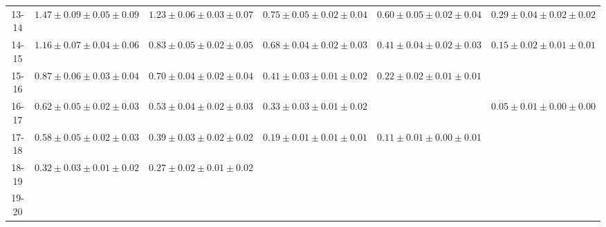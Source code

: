 \begin{sidewaystable}[!htbp]
{\begin{tabular}{c|ccccc}
13-14 & $1.47\pm0.09\pm0.05\pm0.09$ & $1.23\pm0.06\pm0.03\pm0.07$ & $0.75\pm0.05\pm0.02\pm0.04$ & $0.60\pm0.05\pm0.02\pm0.04$ & $0.29\pm0.04\pm0.02\pm0.02$\\  \cline{6-6}
14-15 &   $1.16\pm0.07\pm0.04\pm0.06$ &   $0.83\pm0.05\pm0.02\pm0.05$ &   $0.68\pm0.04\pm0.02\pm0.03$ &   $0.41\pm0.04\pm0.02\pm0.03$ &  \multirow{2}{*}{ $0.15\pm0.02\pm0.01\pm0.01$}   \\  \cline{5-5}
15-16 &   $0.87\pm0.06\pm0.03\pm0.04$ &   $0.70\pm0.04\pm0.02\pm0.04$ &   $0.41\pm0.03\pm0.01\pm0.02$ & \multirow{2}{*}{ $0.22\pm0.02\pm0.01\pm0.01$} &   \\  \cline{6-6}
16-17 &    $0.62\pm0.05\pm0.02\pm0.03$ &    $0.53\pm0.04\pm0.02\pm0.03$ &    $0.33\pm0.03\pm0.01\pm0.02$ &     & \multirow{4}{*}{ $0.05\pm0.01\pm0.00\pm0.00$} \\ \cline{4-5}
17-18 &    $0.58\pm0.05\pm0.02\pm0.03$ &    $0.39\pm0.03\pm0.02\pm0.02$ & \multirow{3}{*}{ $0.19\pm0.01\pm0.01\pm0.01$} & \multirow{3}{*}{ $0.11\pm0.01\pm0.00\pm0.01$} &   \\  \cline{2-3}
18-19 & \multirow{2}{*}{ $0.32\pm0.03\pm0.01\pm0.02$} & \multirow{2}{*}{ $0.27\pm0.02\pm0.01\pm0.02$} &    &    &   \\
19-20 &    &    &    &    &   \\ \cline{2-4}
 \hline
\end{tabular}
}
\label{tab:results_fromb}
\end{sidewaystable}

